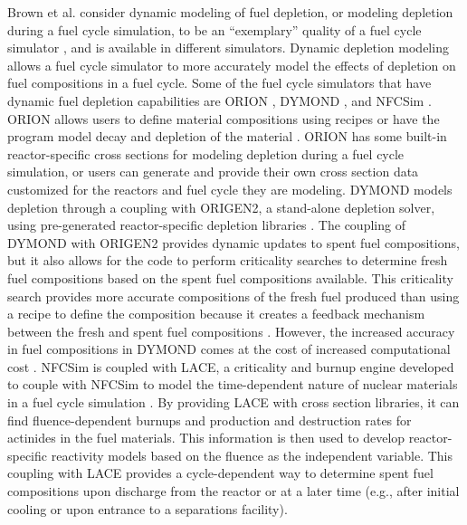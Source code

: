 Brown et al. consider dynamic modeling of fuel depletion, or 
modeling depletion during a fuel cycle simulation, to be an 
``exemplary'' quality 
of a fuel cycle simulator \cite{brown_identification_2016},
and is available in different simulators. Dynamic depletion 
modeling allows a fuel cycle simulator to more accurately model  
the effects of depletion on fuel compositions in a fuel cycle. Some of the 
fuel cycle simulators that have dynamic fuel depletion capabilities 
are ORION \cite{feng_standardized_2016}, \gls{DYMOND} 
\cite{richards_application_2021}, and \gls{NFCSim} \cite{schneider_nfcsim:_2005}.
ORION allows 
users to define material compositions using recipes or have the 
program model decay and depletion of the material \cite{sunny_transition_2015}. ORION 
has some built-in reactor-specific cross sections for modeling 
depletion during a fuel cycle simulation, or users can generate 
and provide their own cross section data customized for the reactors and fuel cycle 
they are modeling. \gls{DYMOND} models depletion through a coupling with 
ORIGEN2, a stand-alone depletion solver, using pre-generated 
reactor-specific depletion libraries \cite{richards_application_2021}.
The coupling of \gls{DYMOND} with ORIGEN2 provides dynamic updates to 
spent fuel compositions, but it also allows for the code to perform 
criticality searches to determine fresh fuel compositions based on 
the spent fuel compositions available. This criticality search provides 
more accurate compositions of the fresh fuel produced than using a recipe 
to define the composition because it creates a feedback mechanism 
between the fresh and spent fuel compositions \cite{richards_application_2021}.
However, the increased accuracy in fuel compositions in \gls{DYMOND} comes 
at the cost of increased computational cost \cite{richards_application_2021}.
\gls{NFCSim} is coupled with \gls{LACE}, a criticality and burnup 
engine developed to couple with \gls{NFCSim} to model the 
time-dependent nature of nuclear materials in a fuel cycle simulation
\cite{schneider_nfcsim:_2005}. By providing \gls{LACE} with cross 
section libraries, it can find fluence-dependent burnups and production 
and destruction rates for actinides in the fuel materials. This 
information is then used to develop reactor-specific reactivity models 
based on the fluence as the independent variable. This coupling 
with \gls{LACE} provides a cycle-dependent way to determine 
spent fuel compositions upon discharge from the reactor or at a 
later time (e.g., after initial cooling or upon entrance to a 
separations facility). 

